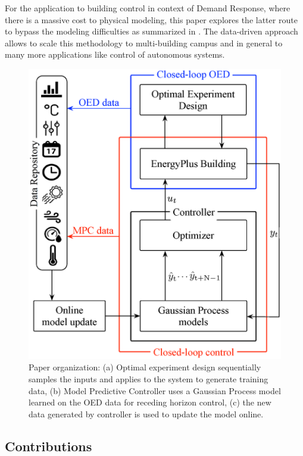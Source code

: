 For the application to building control in context of Demand Response, where there is a massive cost to physical modeling, this paper explores the latter route to bypass the modeling difficulties as summarized in \cite{Sturzenegger2016}. The data-driven approach allows to scale this methodology to multi-building campus and in general to many more applications like control of autonomous systems.
\begin{figure}[!t]
	\centering
	\includegraphics[width=0.8\linewidth]{figures/overview.eps}
	\caption{Paper organization: (a) Optimal experiment design sequentially samples the inputs and applies to the system to generate training data, (b) Model Predictive Controller uses a Gaussian Process model learned on the OED data for receding horizon control, (c) the new data generated by controller is used to update the model online.}
	\captionsetup{justification=centering}
	\label{F:intro}
\end{figure}

\subsection{Contributions}

